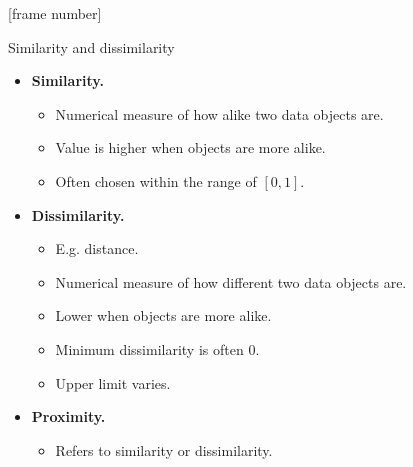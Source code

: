 \documentclass[aspectratio=169,t]{beamer}
\begin{document}
  {
    [frame number]
    \begin{frame}{Similarity and dissimilarity}
    \centering
    \begin{itemize}
        \item \textbf{Similarity.}
        \begin{itemize}
          \item Numerical measure of how alike two data objects are.
          \item Value is higher when objects are more alike.
          \item Often chosen within the range of $[0,1]$.
        \end{itemize}
        \item \textbf{Dissimilarity.}
        \begin{itemize}
          \item E.g. distance.
          \item Numerical measure of how different two data objects are.
          \item Lower when objects are more alike.
          \item Minimum dissimilarity is often $0$.
          \item Upper limit varies.
        \end{itemize}
        \item \textbf{Proximity.}
        \begin{itemize}
          \item Refers to similarity or dissimilarity.
        \end{itemize}
    \end{itemize}
    \end{frame}
  }
\end{document}
